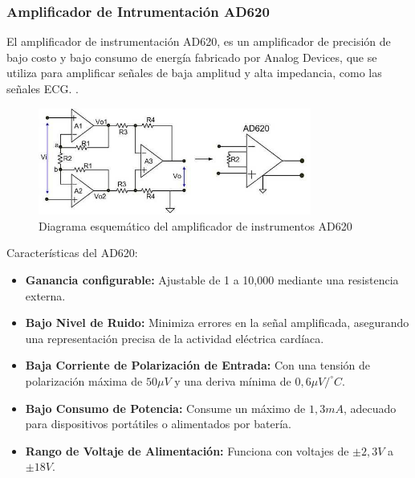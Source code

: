         \subsubsection{Amplificador de Intrumentación AD620}
            El amplificador de instrumentación AD620, es un amplificador de precisión de bajo costo y bajo consumo de energía fabricado por Analog Devices, que se utiliza para amplificar señales de baja amplitud y alta impedancia, como las señales ECG. \cite{AD620_AnalogDevices,AD620_DigiKey}.

            \begin{figure}[H]
                \centering
                \includegraphics[width=0.8\textwidth]{img/Desarrollo/AD620.png}
                \caption[Diagrama esquemático del amplificador de instrumentos AD620.]{Diagrama esquemático del amplificador de instrumentos AD620\footnotemark}
                \label{fig:AD620}
            \end{figure}

            \hfill \break
            Características del AD620:
            \begin{itemize}
                \item \textbf{Ganancia configurable:} Ajustable de 1 a 10,000 mediante una resistencia externa.
                \item \textbf{Bajo Nivel de Ruido:} Minimiza errores en la señal amplificada, asegurando una representación precisa de la actividad eléctrica cardíaca.
                \item \textbf{Baja Corriente de Polarización de Entrada:} Con una tensión de polarización máxima de $50 \mu V$ y una deriva mínima de $0,6 \mu V / ^{\circ} C$.
                \item \textbf{Bajo Consumo de Potencia:} Consume un máximo de $1,3 mA$, adecuado para dispositivos portátiles o alimentados por batería.
                \item \textbf{Rango de Voltaje de Alimentación:} Funciona con voltajes de $\pm 2,3 V$ a $\pm 18 V$.
            \end{itemize}

